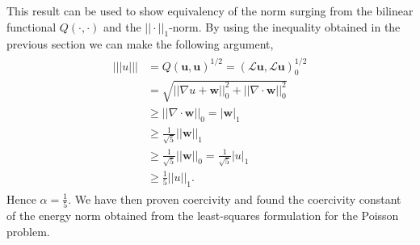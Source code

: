 This result can be used to show equivalency of the norm surging from the bilinear functional $Q(\cdot,\cdot)$ and the $|| \cdot ||_1$-norm. 
By using the inequality obtained in the previous section we can make the following argument,
\begin{align}
	\begin{split}
	|||u||| 
	&=Q(\mathbf{u},\mathbf{u})^{1/2} 
	= (\mathcal{L}\mathbf{u},\mathcal{L}\mathbf{u})_0^{1/2} \\
	&= \sqrt{||\nabla u+\mathbf{w}||^2_0+||\nabla \cdot \mathbf{w}||^2_0}\\
	&\geq ||\nabla \cdot \mathbf{w}||_0
	= |\mathbf{w}|_1 \\
	&\geq \frac{1}{\sqrt{5}}||\mathbf{w}||_1\\
	&\geq \frac{1}{\sqrt{5}}||\mathbf{w}||_0
	= \frac{1}{\sqrt{5}}|u|_1\\
	&\geq \frac{1}{5}||u||_1.
	\end{split}
	\label{eq:resultAlpha}
\end{align}
Hence $\alpha=\frac{1}{5}$. We have then proven coercivity and found the coercivity constant of the energy norm obtained from the least-squares formulation for the Poisson problem.  
%
